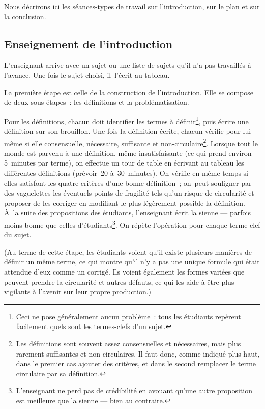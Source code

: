 \documentclass[a4paper,12pt]{article}
\begin{document}
Nous décrirons ici les séances-types de travail sur l'introduction, sur
le plan et sur la conclusion. 

\subsection{Enseignement de l'introduction}
\label{sec:org91d34c0}

L'enseignant arrive avec un sujet ou une liste de sujets qu'il n'a pas
travaillés à l'avance. Une fois le sujet choisi, il l'écrit au tableau.

La première étape est celle de la construction de l'introduction. Elle
se compose de deux sous-étapes : les définitions et la problématisation. 

Pour les définitions, chacun doit identifier les termes à définir\footnote{Ceci ne pose généralement aucun problème : tous les étudiants
repèrent facilement quels sont les termes-clefs d'un sujet.},
puis écrire une définition sur son brouillon. Une fois la définition
écrite, chacun vérifie pour lui-même si elle consensuelle, nécessaire,
suffisante et non-circulaire\footnote{Les définitions sont souvent assez consensuelles et nécessaires,
mais plus rarement suffisantes et non-circulaires. Il faut donc, comme
indiqué plus haut, dans le premier cas ajouter des critères, et dans le
second remplacer le terme circulaire par sa définition.}. Lorsque tout le monde est parvenu à
une définition, même insatisfaisante (ce qui prend environ 5 minutes par
terme), on effectue un tour de table en écrivant au tableau les
différentes définitions (prévoir 20 à 30 minutes). On vérifie en même
temps si elles satisfont les quatre critères d'une bonne définition ;
on peut souligner par des vaguelettes les éventuels points de fragilité
tels qu'un risque de circularité et proposer de les corriger en
modifiant le plus légèrement possible la définition. À la suite des
propositions des étudiants, l'enseignant écrit la sienne — parfois moins
bonne que celles d'étudiants\footnote{L'enseignant ne perd pas de crédibilité en avouant qu'une autre
proposition est meilleure que la sienne — bien au contraire.}. On répète l'opération pour chaque
terme-clef du sujet.

(Au terme de cette étape, les étudiants voient qu'il existe plusieurs
manières de définir un même terme, ce qui montre qu'il n'y a pas une
unique formule qui était attendue d'eux comme un corrigé. Ils voient
également les formes variées que peuvent prendre la circularité et
autres défauts, ce qui les aide à être plus vigilants à l'avenir sur
leur propre production.)
\end{document}
